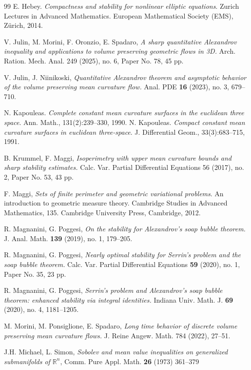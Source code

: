 \documentclass[reqno,11pt]{amsart}
\numberwithin{equation}{section}
\theoremstyle{remark}
\begin{document}
\begin{thebibliography}{99}
E. Hebey. \emph{ Compactness and stability for nonlinear elliptic equations}. Zurich Lectures
 in Advanced Mathematics. European Mathematical Society (EMS), Z\"urich, 2014.

V. Julin, M. Morini, F. Oronzio, E. Spadaro, 
\emph{A sharp quantitative Alexandrov inequality and applications to volume preserving geometric flows in 3D.}
Arch. Ration. Mech. Anal. 249 (2025), no. 6, Paper No. 78, 45 pp.

V. Julin, J. Niinikoski,
\emph{Quantitative Alexandrov theorem and asymptotic behavior of the volume preserving mean curvature flow.}
Anal. PDE \textbf{16} (2023), no. 3, 679--710.


N. Kapouleas. \emph{Complete constant mean curvature surfaces in the euclidean three  space}. Ann. Math., 131(2):239--330, 1990.
N. Kapouleas. \emph{Compact constant mean curvature surfaces in euclidean three-space}.
 J. Differential Geom., 33(3):683--715, 1991.


B. Krummel, F. Maggi, 
{\em Isoperimetry with upper mean curvature bounds and sharp stability estimates. }
Calc. Var. Partial Differential Equations 56 (2017), no. 2, Paper No. 53, 43 pp.


F. Maggi, \emph{Sets of finite perimeter and geometric variational problems}. An introduction to geometric measure theory. Cambridge Studies in Advanced Mathematics, 135. Cambridge University Press, Cambridge, 2012.


R. Magnanini, G. Poggesi,
{\it On the stability for Alexandrov's soap bubble theorem.}
J. Anal. Math. \textbf{139} (2019), no. 1, 179--205.

R. Magnanini, G. Poggesi,
{\it Nearly optimal stability for Serrin's problem and the soap bubble theorem.} Calc. Var. Partial Differential Equations \textbf{59} (2020), no. 1, Paper No. 35, 23 pp.

R. Magnanini, G. Poggesi,
{\it Serrin's problem and Alexandrov's soap bubble theorem: enhanced stability via integral identities.} Indiana Univ. Math. J. \textbf{69} (2020), no. 4, 1181--1205.

M. Morini, M. Ponsiglione, E. Spadaro, 
{\em Long time behavior of discrete volume preserving mean curvature flows.}
J. Reine Angew. Math. 784 (2022), 27--51.


J.H. Michael, L. Simon, \emph{Sobolev and mean value inequalities on generalized submanifolds of $\mathbb R^n$}, Comm. Pure
Appl. Math.  \textbf{26} (1973) 361--379


\end{thebibliography}
\end{document}
